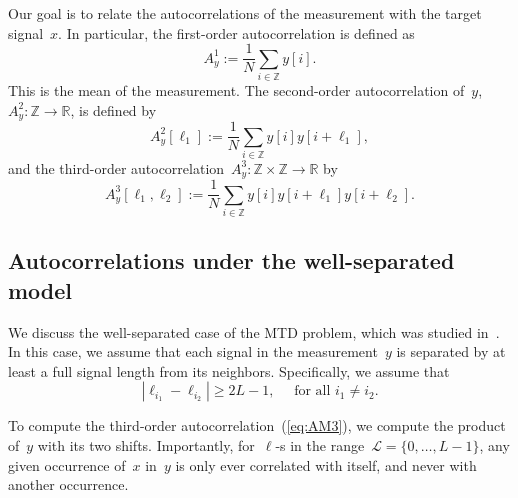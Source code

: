 \documentclass{article}
\begin{document}
Our goal is to relate the autocorrelations of the measurement with the target signal~$x$. In particular, the first-order autocorrelation is defined as
\begin{equation}
\label{eq:AM1}
A_{y}^1 := \frac{1}{N} \sum_{i \in \mathbb{Z}} y[i].
\end{equation}
This is the mean of the measurement. The second-order autocorrelation of~$y$, \mbox{$A_{y}^2: \mathbb{Z} \rightarrow \mathbb{R}$}, is defined by
\begin{equation}
\label{eq:AM2}
A_{y}^2 [\ell_1] := \frac{1}{N} \sum_{i \in \mathbb{Z}} y[i] y[i + \ell_1],
\end{equation}
and the third-order autocorrelation~\mbox{$A_{y}^3: \mathbb{Z} \times \mathbb{Z} \rightarrow \mathbb{R}$} by
\begin{equation}
\label{eq:AM3}
A_{y}^3 [\ell_1, \ell_2] := \frac{1}{N} \sum_{i \in \mathbb{Z}} y[i] y[i + \ell_1] y[i + \ell_2].
\end{equation}


\subsection{Autocorrelations under the well-separated model}
\label{subsec:relations}
We discuss the \mbox{well-separated} case of the MTD problem, which was studied in~\cite{bendory2019multi}. In this case, we assume that each signal in the measurement~$y$ is separated by at least a full signal length from its neighbors. Specifically, we assume that
\begin{equation}
\label{eq:sep}
|\ell_{i_1} - \ell_{i_2}| \ge 2L - 1, \quad \text{ for all } i_1 \ne i_2.
\end{equation}

To compute the third-order autocorrelation~(\ref{eq:AM3}), we compute the product of~$y$ with its two shifts. Importantly, for~\mbox{$\ell$-s} in the range~$\mathcal{L} = \{0, \ldots, {L - 1}\}$, any given occurrence of~$x$ in~$y$ is only ever correlated with itself, and never with another occurrence.
\end{document}
